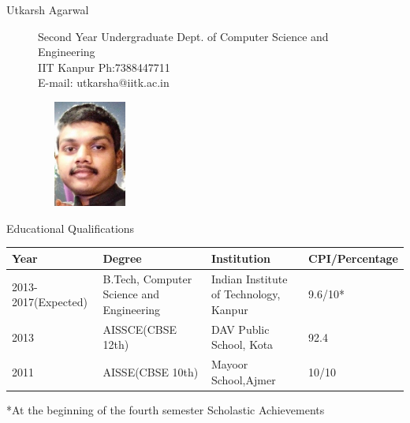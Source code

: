 \documentclass{article}
\begin{document}
\sffamily
\begin{flushleft}
{\Huge{Utkarsh Agarwal}}
\end{flushleft}
\vspace{-1cm}
\begin{figure}[ht]
\begin{minipage}[b]{0.35\linewidth}
\begin{flushleft}
{\small Second Year Undergraduate \newline
       Dept. of Computer Science and Engineering\\
       IIT Kanpur\newline
       Ph:7388447711\\
       E-mail: utkarsha@iitk.ac.in\newline }
\end{flushleft}
\end{minipage}
\hspace{4cm}
\begin{minipage}[b]{0.55\linewidth}
\centering
\includegraphics[width=3.5cm,height=3.5cm]{image.jpg}
\end{minipage}
\end{figure}
{\Large Educational Qualifications}
\newline
\newline
\begin{tabular}{| l | l | l |l|}
\hline
Year         & Degree & Institution & CPI/Percentage\\ \hline
2013-2017(Expected) & B.Tech, Computer Science and Engineering & Indian Institute of Technology, Kanpur & 9.6/10*\\ \hline
2013 & AISSCE(CBSE 12th) & DAV Public School, Kota & 92.4 \\ \hline
2011 & AISSE(CBSE 10th) & Mayoor School,Ajmer & 10/10\\ \hline
\end{tabular}
*At the beginning of the fourth semester \newline\newline\newline
{\Large Scholastic Achievements}
\end{document}
